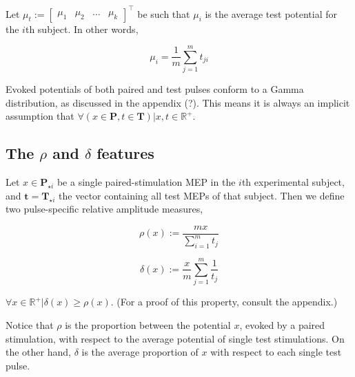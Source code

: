 \documentclass{article}
\begin{document}
\begin{multicols}{2}
        \begin{definition} Let $\mu_t := \begin{bmatrix} \mu_1 &
        \mu_2 & \ldots & \mu_k \end{bmatrix}^\top$ be such that 
$\mu_i$ is the average test potential for the $i$th subject.
In other words,

\begin{equation} \mu_i = \frac{1}{m}\sum_{j=1}^m t_{ji}
\end{equation} \end{definition}

\begin{remark} Evoked potentials of both paired and test
    pulses conform to a Gamma distribution, as discussed in
    the appendix (?). This means it is always an implicit assumption that
    $\forall (x \in \textbf{P}, t\in \textbf{T})|x, t
\in \mathbb{R}^+$. \end{remark}

\subsection{The $\rho$ and $\delta$ features}


\begin{definition} Let $x \in \textbf{P}_{\star i}$ be a
    single paired-stimulation MEP in the $i$th experimental
    subject, and $\textbf{t} = \textbf{T}_{\star i}$ the
    vector containing all test MEPs of that subject. Then we
    define two pulse-specific relative amplitude measures,

    \begin{equation} \rho(x) := \frac{mx}{\sum_{i=1}^mt_j}
    \end{equation}

    \begin{equation} \delta(x) :=
    \frac{x}{m}\sum_{j=1}^m\frac{1}{t_j} \end{equation}
\end{definition}

\begin{remark} $\forall x \in \mathbb{R}^+|\delta(x) \geq
\rho(x)$. (For a proof of this property, consult the
appendix.) \end{remark}

Notice that $\rho$ is the proportion between the potential
$x$, evoked by a paired stimulation, with respect to the
average potential of single test stimulations. On the other
hand, $\delta$ is the average proportion of $x$ with respect
to each single test pulse.



\end{multicols}
\end{document}
